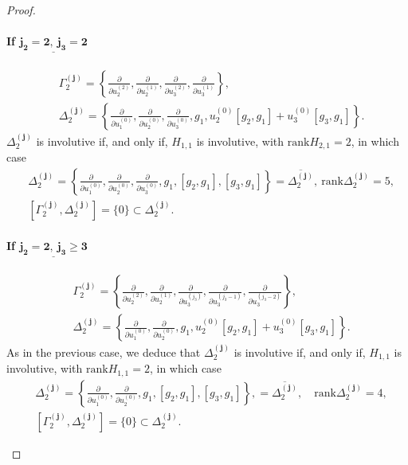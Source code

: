 \documentclass[10pt]{article}
\newcommand{\3}{\mathbf{3}}
\newcommand{\2}{\mathbf{2}}
\newcommand{\1}{\mathbf{1}}
\newcommand{\0}{\mathbf{0}}
\newcommand{\mbf}[1]{\mathbf{#1}}
\newcommand{\rk}{\mathrm{rank}}
\newcommand{\ddu}[2]{\frac{\partial}{\partial u_{#1}^{(#2)}}}
\newcommand{\ol}[1]{\overline{#1}}
\begin{document}
\begin{proof}
\begin{enumerate}

\paragraph{If $\underline{\mathbf{j_{2}=2,~j_{3} = 2}}$}
$$\begin{aligned}
&\Gamma_{2}^{(\mbf{j})} = \left\{ \ddu{2}{2},  \ddu{2}{1}, \ddu{3}{2}, \ddu{3}{1} \right\}, \\
&\Delta_{2}^{(\mbf{j})} = \left\{\ddu{1}{0}, \ddu{2}{0}, \ddu{3}{0}, g_{1},  u_{2}^{(0)}[g_{2},g_{1}]+ u_{3}^{(0)}[g_{3},g_{1}] \right\}.
\end{aligned}$$
$\Delta_{2}^{(\mbf{j})}$ is involutive if, and only if, $H_{1,1}$ is involutive, with $\rk H_{2,1} = 2$, in which case
$$\begin{aligned}&\Delta_{2}^{(\mbf{j})} = \left\{\ddu{1}{0}, \ddu{2}{0}, \ddu{3}{0},  g_{1}, [g_{2},g_{1}], [g_{3},g_{1}]\right\}= \ol{\Delta_{2}^{(\mbf{j})}}, \ \rk \Delta_{2}^{(\mbf{j})} = 5, \\ &[\Gamma_{2}^{(\mbf{j})}, \Delta_{2}^{(\mbf{j})}] = \{ 0 \} \subset \Delta_{2}^{(\mbf{j})}.\end{aligned}$$
\paragraph{If $\underline{\mathbf{j_{2}=2,~j_{3} \geq 3}}$}


$$\begin{aligned}
&\Gamma_{2}^{(\mbf{j})} = \left\{ \ddu{2}{2},  \ddu{2}{1}, \ddu{3}{j_{3}}, \ddu{3}{j_{3}-1}, \ddu{3}{j_{3}-2}  \right\}, \\
&\Delta_{2}^{(\mbf{j})} = \left\{\ddu{1}{0}, \ddu{2}{0}, g_{1},  u_{2}^{(0)}[g_{2},g_{1}]+ u_{3}^{(0)}[g_{3},g_{1}] \right\}.
\end{aligned}$$
As in the previous case, we deduce that
$\Delta_{2}^{(\mbf{j})}$ is involutive if, and only if, $H_{1,1}$ is involutive, with $\rk H_{1,1} = 2$, in which case
$$\begin{aligned}&\Delta_{2}^{(\mbf{j})} = \left\{\ddu{1}{0}, \ddu{2}{0},  g_{1}, [g_{2},g_{1}], [g_{3},g_{1}]\right\},= \ol{\Delta_{2}^{(\mbf{j})}},  \quad  \rk \Delta_{2}^{(\mbf{j})} = 4, \\ &[\Gamma_{2}^{(\mbf{j})}, \Delta_{2}^{(\mbf{j})}] = \{ 0 \} \subset \Delta_{2}^{(\mbf{j})}.\end{aligned}$$



\end{enumerate}
\end{proof}
\end{document}
